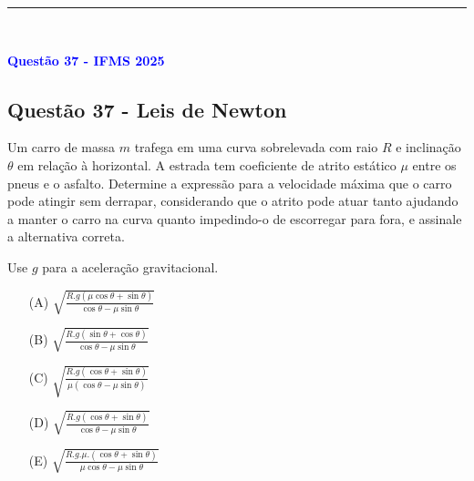 \documentclass[a4paper,12pt]{article}
\begin{document}
\noindent\rule{\linewidth}{0.6pt}\\

\begin{flushleft}
\textbf{\textcolor{blue}{\Large Quest\~ao 37 - IFMS 2025}}\\
\subsection{Quest\~ao 37 - Leis de Newton}
Um carro de massa \( m \) trafega em uma curva sobrelevada com raio \( R \) e inclinação \(\theta\) em relação à horizontal. 
A estrada tem coeficiente de atrito estático \(\mu\) entre os pneus e o asfalto. Determine a expressão para a velocidade 
máxima que o carro pode atingir sem derrapar, considerando que o atrito pode atuar tanto ajudando a manter o carro na curva 
quanto impedindo-o de escorregar para fora, e assinale a alternativa correta.

Use \( g \) para a aceleração gravitacional.

\begin{itemize}
\item[(A)] $\sqrt{\frac{R.g\left(\mu\cos\theta +\sin\theta\right)}{\cos\theta - \mu\sin\theta}}$
\item[(B)] $\sqrt{\frac{R.g\left(\sin\theta + \cos\theta\right)}{\cos\theta - \mu\sin\theta}}$  
\item[(C)] $\sqrt{\frac{R.g\left(\cos\theta +\sin\theta\right)}{\mu\left(\cos\theta - \mu\sin\theta\right)}}$
\item[(D)] $\sqrt{\frac{R.g\left(\cos\theta +\sin\theta\right)}{\cos\theta - \mu\sin\theta}}$
\item[(E)] $\sqrt{\frac{R.g.\mu.\left(\cos\theta +\sin\theta\right)}{\mu\cos\theta - \mu\sin\theta}}$
\end{itemize}

\vspace{0.5cm}

\begin{center}
\end{center}
\end{flushleft}
\end{document}
